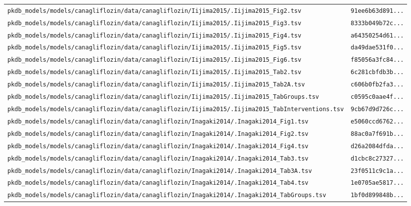 \documentclass{article}
\begin{document}
\begin{longtable}{ll}
\texttt{pkdb\_models/models/canagliflozin/data/canagliflozin/Iijima2015/.Iijima2015\_Fig2.tsv} & \texttt{91ee6b63d891...} \\
\texttt{pkdb\_models/models/canagliflozin/data/canagliflozin/Iijima2015/.Iijima2015\_Fig3.tsv} & \texttt{8333b049b72c...} \\
\texttt{pkdb\_models/models/canagliflozin/data/canagliflozin/Iijima2015/.Iijima2015\_Fig4.tsv} & \texttt{a64350254d61...} \\
\texttt{pkdb\_models/models/canagliflozin/data/canagliflozin/Iijima2015/.Iijima2015\_Fig5.tsv} & \texttt{da49dae531f0...} \\
\texttt{pkdb\_models/models/canagliflozin/data/canagliflozin/Iijima2015/.Iijima2015\_Fig6.tsv} & \texttt{f85056a3fc84...} \\
\texttt{pkdb\_models/models/canagliflozin/data/canagliflozin/Iijima2015/.Iijima2015\_Tab2.tsv} & \texttt{6c281cbfdb3b...} \\
\texttt{pkdb\_models/models/canagliflozin/data/canagliflozin/Iijima2015/.Iijima2015\_Tab2A.tsv} & \texttt{c606b0fb2fa3...} \\
\texttt{pkdb\_models/models/canagliflozin/data/canagliflozin/Iijima2015/.Iijima2015\_TabGroups.tsv} & \texttt{c0595c0aae4f...} \\
\texttt{pkdb\_models/models/canagliflozin/data/canagliflozin/Iijima2015/.Iijima2015\_TabInterventions.tsv} & \texttt{9cb67d9d726c...} \\
\texttt{pkdb\_models/models/canagliflozin/data/canagliflozin/Inagaki2014/.Inagaki2014\_Fig1.tsv} & \texttt{e5060ccd6762...} \\
\texttt{pkdb\_models/models/canagliflozin/data/canagliflozin/Inagaki2014/.Inagaki2014\_Fig2.tsv} & \texttt{88ac0a7f691b...} \\
\texttt{pkdb\_models/models/canagliflozin/data/canagliflozin/Inagaki2014/.Inagaki2014\_Fig4.tsv} & \texttt{d26a2084dfda...} \\
\texttt{pkdb\_models/models/canagliflozin/data/canagliflozin/Inagaki2014/.Inagaki2014\_Tab3.tsv} & \texttt{d1cbc8c27327...} \\
\texttt{pkdb\_models/models/canagliflozin/data/canagliflozin/Inagaki2014/.Inagaki2014\_Tab3A.tsv} & \texttt{23f0511c9c1a...} \\
\texttt{pkdb\_models/models/canagliflozin/data/canagliflozin/Inagaki2014/.Inagaki2014\_Tab4.tsv} & \texttt{1e0705ae5817...} \\
\texttt{pkdb\_models/models/canagliflozin/data/canagliflozin/Inagaki2014/.Inagaki2014\_TabGroups.tsv} & \texttt{1bf0d899848b...} \\

\end{longtable}
\end{document}
